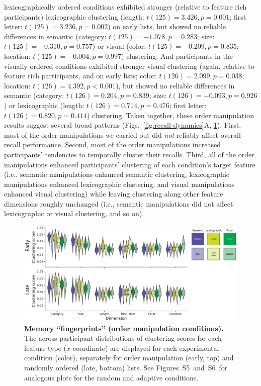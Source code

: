 \documentclass[11pt]{article}
\newcommand{\fingerprintsRandom}{S5}
\newcommand{\fingerprintsAdaptive}{S6}
\begin{document}
lexicographically ordered conditions exhibited stronger (relative to feature
rich participants) lexicographic clustering (length: $t(125) = 3.426, p =
0.001$; first letter: $t(125) = 3.236, p = 0.002$) on early lists, but showed
no reliable differences in semantic (category: $t(125) = -1.078, p = 0.283$;
size: $t(125) = -0.310, p = 0.757$) or visual (color: $t(125) = -0.209, p =
0.835$; location: $t(125) = -0.004, p = 0.997$) clustering. And participants in
the visually ordered conditions exhibited stronger visual clustering (again,
relative to feature rich participants, and on early lists; color: $t(126) =
2.099, p = 0.038$; location: $t(126) = 4.392, p < 0.001$), but showed no
reliable differences in semantic (category: $t(126) = 0.204, p = 0.839$; size:
$t(126) = -0.093, p = 0.926$) or lexicographic (length: $t(126) = 0.714, p =
0.476$; first letter: $t(126) = 0.820, p = 0.414$) clustering. Taken together,
these order manipulation results suggest several broad patterns
(Figs.~\ref{fig:recall-dynamics}A, \ref{fig:fingerprints}). First, most of the
order manipulations we carried out did \textit{not} reliably affect overall
recall performance. Second, most of the order manipulations increased
participants' tendencies to temporally cluster their recalls. Third, all of the
order manipulations enhanced participants' clustering of each condition's
target feature (i.e., semantic manipulations enhanced semantic clustering,
lexicographic manipulations enhanced lexicographic clustering, and visual
manipulations enhanced visual clustering) while leaving clustering along other
feature dimensions roughly unchanged (i.e., semantic manipulations did not
affect lexicographic or visual clustering, and so on).

\begin{figure}[tp] \centering
    \includegraphics[width=\textwidth]{figures/fingerprints}
    
\caption{\textbf{Memory ``fingerprints'' (order manipulation conditions).} The
across-participant distributions of clustering scores for each feature type
($x$-coordinate) are displayed for each experimental condition (color),
separately for order manipulation (early, top) and randomly ordered (late,
bottom) lists. See Figures~\fingerprintsRandom~and~\fingerprintsAdaptive~for
analogous plots for the random and adaptive conditions.}
\label{fig:fingerprints}

\end{figure}
\end{document}
